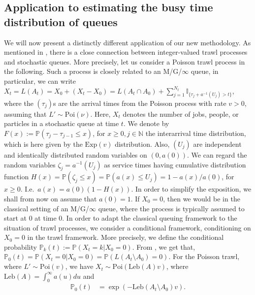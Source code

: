 \documentclass{article}
\theoremstyle{plain}
\theoremstyle{definition}
\theoremstyle{remark}
\newcommand{\Leb}{\ensuremath{\mathrm{Leb}}}
\begin{document}
\subsection{Application to estimating the busy time distribution of queues}
We will now present a distinctly different application of our new methodology. As mentioned in \cite{BNLSV2014}, there is a close connection between integer-valued trawl processes and stochastic queues. More precisely, let us 
consider a Poisson trawl process in the following. Such a process is closely related to an  M/G/$\infty$ queue, in particular, we can write
$X_t= L(A_t)=X_0+(X_t-X_0)=L(A_t\cap A_0)+\sum_{j=1}^{N_t}\mathbb{I}_{\{\tau_j+a^{-1}(U_j)>t\}}$,
where the $(\tau_j)$s are the arrival times from the Poisson process with rate $v>0$, assuming that $L'\sim \mathrm{Poi}(\nu)$. Here, $X_t$ denotes the number of jobs, people, or particles in a stochastic queue at time $t$.
We denote by 
$F(x):= \mathbb{P}(\tau_j-\tau_{j-1}\leq x)$, for $x\geq 0, j \in \mathbb{N}$
the interarrival time distribution, which is here given by the $\mathrm{Exp}(v)$ distribution. 
Also, $(U_j)$ are independent and identically distributed random variables on $(0, a(0))$.
We can regard the random variables 
 $\zeta_j=a^{-1}(U_j)$ as  service times having cumulative distribution function  
 $H(x)=\mathbb{P}(\zeta_j\leq x)=\mathbb{P}(a(x)\leq U_j)=1-a(x)/a(0)$,
  for $x\geq 0$.
 I.e.~$a(x)=a(0)(1-H(x))$.
 In order to simplify the exposition, we shall from now on assume that $a(0)=1$.
If $X_0=0$, then we would be in the classical setting of an M/G/$\infty$ queue, where the process is typically assumed to start at 0 at time 0.  
In order to adapt the classical queuing framework to the situation of trawl processes, we consider a conditional framework, conditioning on $X_0=0$ in the trawl framework. More precisely, 
we define the conditional probability
$\mathbb{P}_k(t):=\mathbb{P}(X_t=k|X_0=0)$. 
 From  \citet[Lemma 4.1 and Proposition 4.1]{BLSV2021}, we get that, 
		    $\mathbb{P}_0(t)=\mathbb{P}(X_{t}=0|X_0=0)
=\mathbb{P}(L(A_{t}\setminus A_0)=0)$.
For the Poisson trawl, where $L'\sim\mathrm{Poi}(v)$,  we have $X_t \sim \mathrm{Poi}(\Leb(A) v)$,
where 
$\Leb(A)=\int_0^{\infty}a(u)du$ and 
\begin{align}\label{eq:P0}
\mathbb{P}_0(t)
    &=
     \exp(-\Leb(A_t\setminus A_0)v). 
\end{align}
\end{document}
